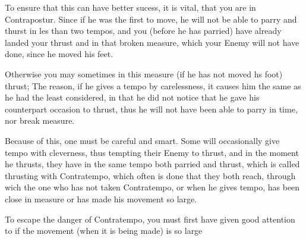 
To ensure that this can have better sucess, it is vital, that you are
in Contrapostur. Since if he was the first to move, he will not be
able to parry and thurst in les than two tempos, and you (before he
has parried) have already landed your thrust and in that broken
measure, which your Enemy will not have done, since he moved his feet.


Otherwise you may sometimes in this measure (if he has not moved hs
foot) thrust; The reason, if he gives a tempo by carelessness, it
causes him the same as he had the least considered, in that he did not
notice that he gave his counterpart occasion to thrust, thus he will
not have been able to parry in time, nor break measure.


Because of this, one must be careful and smart. Some will occasionally
give tempo with cleverness, thus tempting their Enemy to thrust, and
in the moment he thrusts, they have in the same tempo both parried and
thrust, which is called thrusting with Contratempo, which often is
done that they both reach, through wich the one who has not taken
Contratempo, or when he gives tempo, has been close in measure or has
made his movement so large.  


To escape the danger of Contratempo, you must first have given good
attention to if the movement (when it is being made) is so large
